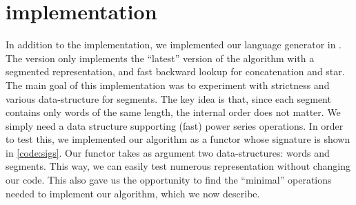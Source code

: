 \section{\ocaml implementation}
\label{sec:ocaml}

\lstset{language=[Objective]Caml}

In addition to the \haskell implementation, we implemented our language generator
in \ocaml.
The \ocaml version only implements the ``latest'' version of the
algorithm with a segmented representation, and fast backward lookup for concatenation and star.
The main goal of this implementation was to experiment with strictness
and various data-structure for segments. 
The key idea is that, since each segment contains only words of the same length,
the internal order does not matter. We simply need a data structure
supporting (fast) power series operations.
In order to test this, we implemented our algorithm as a functor whose signature
is shown in \autoref{code:sigs}.
Our functor takes as argument two data-structures: words and segments.
This way, we can easily test numerous representation without changing
our code. This also gave us the opportunity to find the ``minimal'' operations
needed to implement our algorithm, which we now describe.

